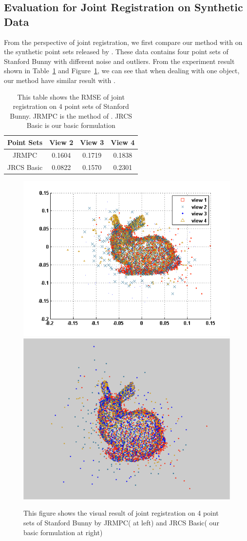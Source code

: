 \subsection{Evaluation for Joint Registration on Synthetic Data}
From the perspective of joint registration, we first compare our method with \cite{Evangelidis2014} on the synthetic point sets released by \cite{Evangelidis2014}. These data contains four point sets of Stanford Bunny with different noise and outliers. From the experiment result shown in Table~\ref{tab:reg} and Figure~\ref{fig:reg}, we can see that when dealing with one object, our method have similar result with \cite{Evangelidis2014}.
\begin{table}
	\centering
	\caption{This table shows the RMSE of joint registration on 4 point sets of Stanford Bunny. JRMPC is the method of \cite{Evangelidis2014}. JRCS Basic is our basic formulation}
	\begin{tabular}{c c c c}
		Point Sets& View 2 & View 3 & View 4 \\
		\hline
		JRMPC & 0.1604 & 0.1719 & 0.1838\\   
		JRCS Basic & 0.0822 &  0.1570  & 0.2301\\
	\end{tabular}
	\label{tab:reg}
\end{table}
\begin{figure}[htb]
	\centering
	\includegraphics[width=0.4\linewidth]{images/JRMPC.png}
	\includegraphics[width=0.4\linewidth]{images/JRCSReg.png}
	\caption{This figure shows the visual result of joint registration on 4 point sets of Stanford Bunny by JRMPC(\cite{Evangelidis2014} at left) and JRCS Basic( our basic formulation at right) }
	\label{fig:reg}
\end{figure}
